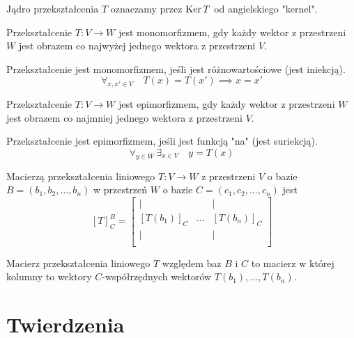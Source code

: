 \documentclass[a4paper,12pt]{article}
\begin{document}
\begin{notation}
	Jądro przekształcenia $T$ oznaczamy przez $\operatorname{Ker} T$ od angielskiego "kernel".
\end{notation}

\begin{definition}[Monomorfizm]
	Przekształcenie $T\colon V \to W$ jest monomorfizmem, gdy każdy wektor z przestrzeni $W$ jest obrazem co najwyżej jednego wektora z przestrzeni $V$.  
\end{definition}

\begin{intuitive}
	Przekształcenie jest monomorfizmem, jeśli jest różnowartościowe (jest iniekcją).
	\[
		\forall_{x,x' \in V}\quad T(x) = T(x') \implies x = x'
	\]
\end{intuitive}

\begin{definition}[Epimorfizm]
	Przekształcenie $T\colon V \to W$ jest epimorfizmem, gdy każdy wektor z przestrzeni $W$ jest obrazem co najmniej jednego wektora z przestrzeni $V$.  
\end{definition}

\begin{intuitive}
	Przekształcenie jest epimorfizmem, jeśli jest funkcją "na" (jest suriekcją).
	\[
		\forall_{y \in W}\, \exists_{x \in V}\quad y = T(x)
	\]
\end{intuitive}

\begin{definition}
	Macierzą przekształcenia liniowego $T\colon V \to W$ z przestrzeni $V$ o bazie $B = (b_1,b_2,\dots,b_n)$ w przestrzeń $W$ o bazie $C = (c_1,c_2,\dots,c_n)$ jest
	\[
		[T]^B_C = 
		\begin{bmatrix}
			| &  &  | \\
			[T(b_1)]_C & \dots & [T(b_n)]_C  \\
			| &  & |  \\
		\end{bmatrix}
	\]   
\end{definition}

\begin{intuitive}
	Macierz przekształcenia liniowego $T$ względem baz $B$ i $C$ to macierz w której kolumny to wektory $C$-współrzędnych wektorów $T(b_1), \dots, T(b_n)$. 
\end{intuitive}

\newpage

\section{Twierdzenia}
\hfill
\end{document}
